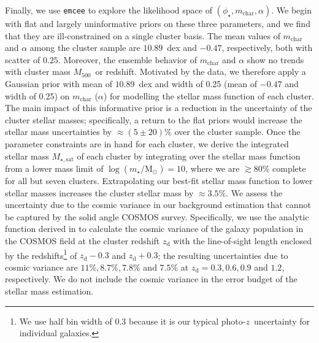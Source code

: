 \documentclass[useAMS,usenatbib,iop,numberedappendix]{mn2e}
\newcommand{\Msun}{\ensuremath{\mathrm{M}_{\odot}}}
\newcommand{\Mfiveoo}{\ensuremath{M_{500}}}
\newcommand{\redshift}{\ensuremath{z}}
\newcommand{\mstar}{\ensuremath{m_{\star}}}
\newcommand{\percent}{\ensuremath{\%}}
\begin{document}
Finally, we use \texttt{emcee} \citep{foreman13} to explore the likelihood space of $(\phi_{\star}, m_{\mathrm{char}}, \alpha)$.
We begin with flat and largely uninformative priors on these three parameters, and we find that they are ill-constrained on a single cluster basis.
The mean values of $m_{\mathrm{char}}$ and $\alpha$ among the cluster sample are $10.89$~dex and $-0.47$, respectively, both with scatter of $0.25$.
Moreover, the ensemble behavior of $m_{\mathrm{char}}$ and $\alpha$ show no trends with cluster mass \Mfiveoo\ or redshift.
Motivated by the data, we therefore apply a Gaussian prior with mean of $10.89$~dex and width of 0.25 (mean of $-0.47$ and width of 0.25) on $m_{\mathrm{char}}$ ($\alpha$) for modelling the stellar mass function of each cluster.  The main impact of this informative prior is a reduction in the uncertainty of the cluster stellar masses; specifically, 
a return to the flat priors would increase the stellar mass uncertainties by $\approx(5\pm20)\percent$ over the cluster sample.
Once the parameter constraints are in hand for each cluster, we derive the integrated stellar mass $M_{\star, \mathrm{sat}}$ of each cluster by integrating over the stellar mass function from a lower mass limit of $\log\left(\mstar/\Msun\right) = 10$, where we are $\gtrsim80\percent$ complete for all but seven clusters.  
Extrapolating our best-fit stellar mass function to lower stellar masses increases the cluster stellar mass by $\approx3.5\percent$.
We assess the uncertainty due to the cosmic variance in our background estimation that cannot be captured by the solid angle COSMOS survey.
Specifically, we use the analytic function derived in \citet{driver10} to calculate the cosmic variance of the galaxy population in the COSMOS field at the cluster redshift $\redshift_{\mathrm{d}}$ with the line-of-sight length enclosed by the redshifts\footnote{We use half bin width of $0.3$ because it is our typical photo-\redshift\ uncertainty for individual galaxies.} of $\redshift_{\mathrm{d}} - 0.3$ and $\redshift_{\mathrm{d}} + 0.3$; the resulting uncertainties due to cosmic variance are $11\percent, 8.7\percent, 7.8\percent$ and $7.5\percent$ at $\redshift_{\mathrm{d}}=0.3, 0.6, 0.9$ and $1.2$, respectively.
We do not include the cosmic variance in the error budget of the stellar mass estimation. 
\end{document}

